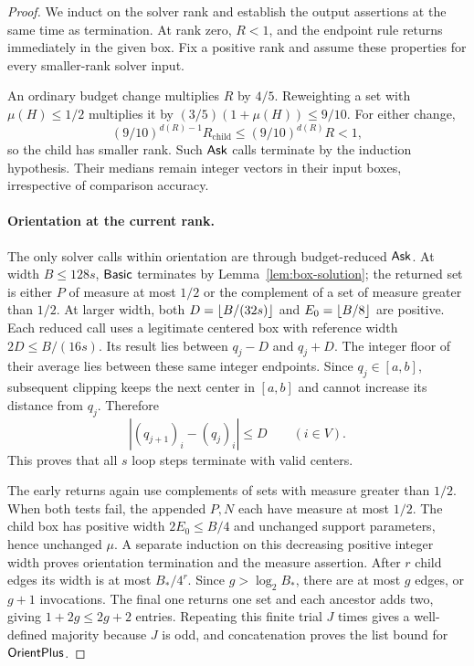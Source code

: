 \begin{proof}
We induct on the solver rank and establish the output assertions at the
same time as termination. At rank zero, $R<1$, and the endpoint rule
returns immediately in the given box. Fix a positive rank and assume
these properties for every smaller-rank solver input.

An ordinary budget change multiplies $R$ by $4/5$. Reweighting a set
with $\mu(H)\le1/2$ multiplies it by
$(3/5)(1+\mu(H))\le9/10$. For either change,
\[
 (9/10)^{d(R)-1}R_{\mathrm{child}}
 \le(9/10)^{d(R)}R<1,
\]
so the child has smaller rank. Such $\mathsf{Ask}$ calls terminate by the
induction hypothesis. Their medians remain integer vectors in their
input boxes, irrespective of comparison accuracy.

\paragraph{Orientation at the current rank.}
The only solver calls within orientation are through budget-reduced
$\mathsf{Ask}$. At width $B\le128s$, $\mathsf{Basic}$ terminates by
Lemma~\ref{lem:box-solution}; the returned set is either $P$ of
measure at most $1/2$ or the complement of a set of measure greater
than $1/2$. At larger width, both
$D=\lfloor B/(32s)\rfloor$ and $E_0=\lfloor B/8\rfloor$ are positive. Each reduced
call uses a legitimate centered box with reference width
$2D\le B/(16s)$. Its result lies between $q_j-D$ and $q_j+D$.
The integer floor of their average lies between these same integer
endpoints. Since $q_j\in[a,b]$, subsequent clipping keeps the next
center in $[a,b]$ and cannot increase its distance from $q_j$. Therefore
\begin{equation}\label{alg:center-step-bound}
 |(q_{j+1})_i-(q_j)_i|\le D\qquad(i\in V).
\end{equation}
This proves that all $s$ loop steps terminate with valid centers.

The early returns again use complements of sets with measure greater
than $1/2$. When both tests fail, the appended $P,N$ each have measure
at most $1/2$. The child box has positive width $2E_0\le B/4$ and
unchanged support parameters, hence unchanged $\mu$. A separate
induction on this decreasing positive integer width proves orientation
termination and the measure assertion. After $r$ child edges its width
is at most $B_*/4^r$. Since $g>\log_2 B_*$, there are at most $g$
edges, or $g+1$ invocations. The final one returns one set and each
ancestor adds two, giving $1+2g\le2g+2$ entries. Repeating this finite
trial $J$ times gives a well-defined majority because $J$ is odd, and
concatenation proves the list bound for $\mathsf{OrientPlus}$.


\end{proof}
